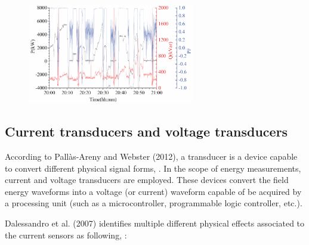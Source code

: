 \begin{figure}[h!]
	\centering
	\begin{minipage}{0.9\textwidth}
		\centering
				\vspace{-0.75em}
		\includegraphics[width=0.65\textwidth,keepaspectratio]{figures/32.EnergyS/liran2014}
				\vspace{-0.75em}
		\label{fig:liran2014}
	\end{minipage}%
	
\end{figure}


\subsection{Current transducers and voltage transducers}
\label{subs:322}	
	According to Pallàs-Areny and Webster (2012), a transducer is a device capable to convert different physical signal forms, \cite{webster2012}. In the scope of energy measurements, current and voltage transducers are employed. These devices convert the field energy waveforms into a voltage (or current) waveform capable of be acquired by a processing unit (such as a microcontroller, programmable logic controller, etc.).
	
	Dalessandro et al. (2007) identifies multiple different physical effects associated to the current sensors %
	as following, \cite{Dalessandro2007}:
	
